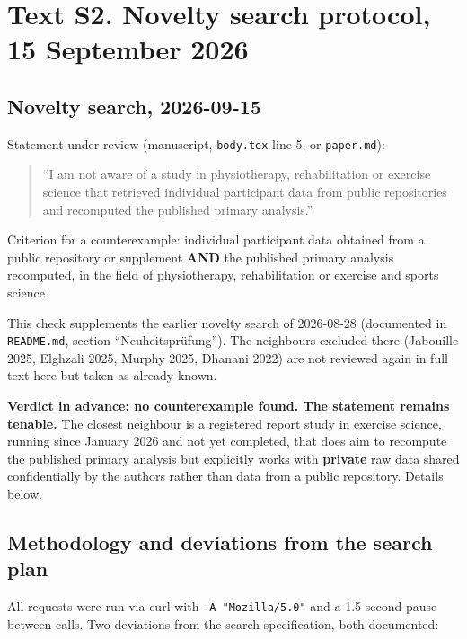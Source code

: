 \section{Text S2. Novelty search protocol, 15 September 2026}\label{text-s2.-novelty-search-protocol-15-september-2026}

\subsection{Novelty search, 2026-09-15}\label{novelty-search-2026-09-15}

Statement under review (manuscript, \texttt{body.tex} line 5, or \texttt{paper.md}):

\begin{quote}
``I am not aware of a study in physiotherapy, rehabilitation or exercise science that retrieved individual participant data from public repositories and recomputed the published primary analysis.''
\end{quote}

Criterion for a counterexample: individual participant data obtained from a public repository or supplement \textbf{AND} the published primary analysis recomputed, in the field of physiotherapy, rehabilitation or exercise and sports science.

This check supplements the earlier novelty search of 2026-08-28 (documented in \texttt{README.md}, section ``Neuheitsprüfung''). The neighbours excluded there (Jabouille 2025, Elghzali 2025, Murphy 2025, Dhanani 2022) are not reviewed again in full text here but taken as already known.

\textbf{Verdict in advance: no counterexample found. The statement remains tenable.} The closest neighbour is a registered report study in exercise science, running since January 2026 and not yet completed, that does aim to recompute the published primary analysis but explicitly works with \textbf{private} raw data shared confidentially by the authors rather than data from a public repository. Details below.

\subsection{Methodology and deviations from the search plan}\label{methodology-and-deviations-from-the-search-plan}

All requests were run via curl with \texttt{-A\ "Mozilla/5.0"} and a 1.5 second pause between calls. Two deviations from the search specification, both documented:

